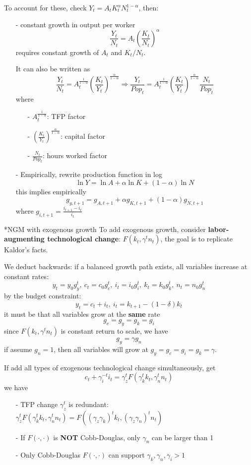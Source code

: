 \documentclass[10pt,landscape,a4paper]{article}
\makeatletter
\renewcommand{\section}{\@startsection{section}{1}{0mm}{1ex}{.2ex}{\normalsize\bfseries}}
\makeatother
\begin{document}
\begin{multicols*}{3}
To  account for these, check $Y_t = A_t K_t^{\alpha}N_t^{1-\alpha}$, then:
\begin{itemize}
    \item[-] constant growth in output per worker
    $$
    \frac{Y_t}{N_t}=A_t\left(\frac{K_t}{N_t}\right)^{\alpha}
    $$
    requires constant growth of $A_t$ and $K_t/N_t$.
    
    It can also be written as
    $$
    \frac{Y_t}{N_t} =A_t^{\frac{1}{1-\alpha}}\left(\frac{K_t}{Y_t}\right)^{\frac{\alpha}{1-\alpha}}\Rightarrow \frac{Y_t}{Pop_t}= A_t^{\frac{1}{1-\alpha}}\left(\frac{K_t}{Y_t}\right)^{\frac{\alpha}{1-\alpha}}\frac{N_t}{Pop_t}
    $$
    where
    \begin{itemize}
        \item[-] $A_t^{\frac{1}{1-\alpha}}$: TFP factor
        \item[-] $\left(\frac{K_t}{Y_t}\right)^{\frac{\alpha}{1-\alpha}}$: capital factor
        \item[-] $\frac{N_t}{Pop_t}$: hours worked factor
    \end{itemize}
    \item[-] Empirically, rewrite production function in log
    $$
    \ln Y=\ln A+\alpha\ln K +(1-\alpha)\ln N
    $$
    this implies empirically
    $$
    g_{y,t+1}=g_{A,t+1}+\alpha g_{K,t+1}+(1-\alpha)g_{N,t+1}
    $$
    where $g_{i,t+1}=\frac{i_{t+1}-i_t}{i_t}$
\end{itemize}

\section*{NGM with exogenous growth}
To add exogenous growth, consider \textbf{labor-augmenting technological change}: $F(k_t,\gamma^t n_t)$, the goal is to replicate Kaldor's facts.

We deduct backwards: if a balanced growth path exists, all variables increase at constant rates:
$$
y_t=y_0g_y^t,\ c_t=c_0g_c^t,\ i_t=i_0g_i^t,\ k_t=k_0g_k^t,\ n_t=n_0 g_n^t 
$$
by the budget constraint:
$$
y_t=c_t+i_t,\ i_t=k_{t+1}-(1-\delta)k_t
$$
it must be that all variables grow at the \textbf{same} rate
$$
g_c = g_y = g_k = g_i
$$
since $F(k_t,\gamma^t n_t)$ is constant return to scale, we have
$$
g_y = \gamma g_n
$$
if assume $g_n=1$, then all variables will grow at $g_y=g_c=g_i=g_k =\gamma$.

If add all types of exogenous technological change simultaneously, get
$$
c_t+\gamma_i^{-t}i_t = \gamma_z^t F(\gamma_k^tk_t,\gamma_n^tn_t)
$$
we have
\begin{itemize}
    \item[-] TFP change $\gamma_z^t$ is redundant: $\gamma_z^tF(\gamma_k^t k_t,\gamma_n^t n_t)=F((\gamma_z\gamma_k)^tk_t,(\gamma_z\gamma_n)^tn_t)$
    \item[-] If $F(\cdot,\cdot)$ is \textbf{NOT} Cobb-Douglas, only $\gamma_n$ can be larger than 1
    \item[-] Only Cobb-Douglas $F(\cdot,\cdot)$ can support $\gamma_k,\gamma_n,\gamma_i>1$
\end{itemize}


\end{multicols*}
\end{document}
